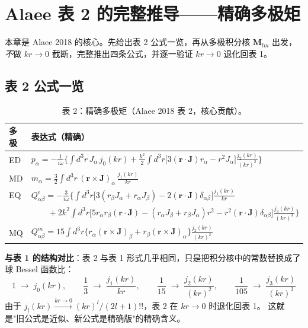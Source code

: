 \section{Alaee 表 2 的完整推导——精确多极矩}

本章是 Alaee 2018 的核心。先给出表 2 公式一览，再从多极积分核 $\mathbf{M}_{lm}$ 出发，
\emph{不}做 $kr\to0$ 截断，完整推出四条公式，并逐一验证 $kr\to0$ 退化回表 1。

\subsection{表 2 公式一览}

\begin{table}[htbp]
\centering
\small
\begin{tabular}{ll}
\toprule
\textbf{多极} & \textbf{表达式（精确）} \\
\midrule
ED & $\displaystyle p_\alpha = -\frac{1}{i\omega}\Bigg\{\int d^3r\,J_\alpha\,j_0(kr)
  + \frac{k^2}{2}\int d^3r\bigl[3(\mathbf{r}\cdot\mathbf{J})r_\alpha - r^2 J_\alpha\bigr]
  \frac{j_2(kr)}{(kr)^2}\Bigg\}$ \\[1.5em]
MD & $\displaystyle m_\alpha = \frac32\int d^3r\,(\mathbf{r}\times\mathbf{J})_\alpha\,
  \frac{j_1(kr)}{kr}$ \\[1.5em]
EQ & $\displaystyle Q^e_{\alpha\beta} = -\frac{3}{i\omega}\Bigg\{
  \int d^3r\bigl[3(r_\beta J_\alpha + r_\alpha J_\beta) - 2(\mathbf{r}\cdot\mathbf{J})\delta_{\alpha\beta}\bigr]
  \frac{j_1(kr)}{kr}$ \\[0.5em]
  & $\displaystyle\qquad + 2k^2\int d^3r\bigl[5r_\alpha r_\beta(\mathbf{r}\cdot\mathbf{J})
  - (r_\alpha J_\beta + r_\beta J_\alpha)r^2 - r^2(\mathbf{r}\cdot\mathbf{J})\delta_{\alpha\beta}\bigr]
  \frac{j_3(kr)}{(kr)^3}\Bigg\}$ \\[1.5em]
MQ & $\displaystyle Q^m_{\alpha\beta} = 15\int d^3r\bigl\{
  r_\alpha(\mathbf{r}\times\mathbf{J})_\beta + r_\beta(\mathbf{r}\times\mathbf{J})_\alpha\bigr\}
  \frac{j_2(kr)}{(kr)^2}$ \\[0.5em]
\bottomrule
\end{tabular}
\caption*{表 2：精确多极矩（Alaee 2018 表 2，核心贡献）。}
\end{table}

\begin{noteworthy}
\textbf{与表 1 的结构对比}：表 2 与表 1 形式几乎相同，只是把积分核中的常数替换成了球 Bessel 函数比：
$$
1 \;\to\; j_0(kr),\qquad
\frac13 \;\to\; \frac{j_1(kr)}{kr},\qquad
\frac1{15} \;\to\; \frac{j_2(kr)}{(kr)^2},\qquad
\frac1{105} \;\to\; \frac{j_3(kr)}{(kr)^3}
$$
由于 $j_l(kr)\xrightarrow{kr\to0}(kr)^l/(2l+1)!!$，表 2 在 $kr\to0$ 时退化回表 1。
这就是"旧公式是近似、新公式是精确版"的精确含义。
\end{noteworthy}

